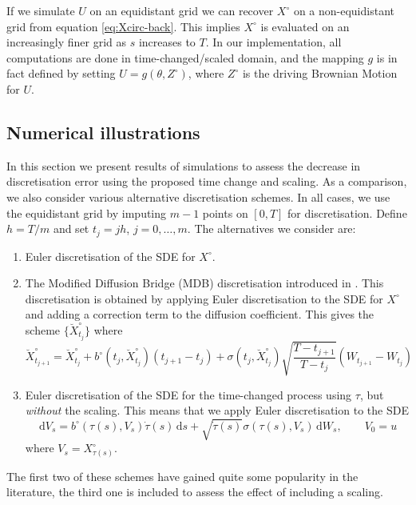 \documentclass[preprint]{imsart}
\newcommand{\si}{\sigma}
\renewcommand{\th}{\theta}
\newcommand{\vt}[1]{\breve{#1}}
\theoremstyle{definition}
\newcommand{\dd}{{\,\mathrm d}}
\begin{document}
%
If we simulate $U$ on an equidistant grid we can recover $X^\circ$ on a non-equidistant grid from equation \eqref{eq:Xcirc-back}. This implies $X^\circ$ is evaluated on an increasingly finer grid as $s$ increases to $T$. 
In our implementation, all computations are done in time-changed/scaled domain, and the mapping $g$ is in fact defined  by setting $U = g(\th, Z^\circ)$, where $Z^\circ$ is the driving Brownian Motion for $U$. 


\subsection{Numerical illustrations}

In this section we present results of simulations to assess the decrease in discretisation error using the proposed time change and scaling. As a comparison, we also consider various alternative discretisation schemes. In all cases, we use the equidistant grid by imputing $m-1$ points on $[0,T]$ for discretisation. Define $h=T/m$ and set  $t_j=jh$, $j=0,\ldots, m$. The alternatives we consider are:
\begin{enumerate}
\item Euler discretisation of the SDE for $X^\circ$.
\item The Modified Diffusion Bridge (MDB) discretisation  introduced in \cite{DurhamGallant}. This discretisation is obtained by  applying Euler discretisation to the SDE for $X^\circ$ and adding a correction term to the diffusion coefficient. This gives the scheme $\{\vt{X}^\circ_{t_j}\}$ where 
\begin{equation}\label{eq:mdb}
 \vt{X}^\circ_{t_{j+1}} = \vt{X}^\circ_{t_j} + b^\circ(t_j, \vt{X}^\circ_{t_j}) (t_{j+1}-t_j) + \si(t_j, \vt{X}^\circ_{t_j})  \sqrt{\frac{T-t_{j+1}}{T-t_j}} (W_{t_{j+1}}-W_{t_j}) 
\end{equation}
\item Euler discretisation of the SDE for the time-changed process using $\tau$, but {\it without} the scaling. This means that we apply Euler discretisation to the SDE 
\[ \dd V_s = b^\circ(\tau(s),V_s) \dot\tau(s) \dd s + \sqrt{\dot\tau(s)} \si(\tau(s),V_s) \dd W_s,\qquad V_0=u \]
where $V_s=X^\circ_{\tau(s)}$.
\end{enumerate}
The first two of these schemes have gained quite some popularity in the literature, the third one is included to assess the effect of including a scaling. 
\end{document}
